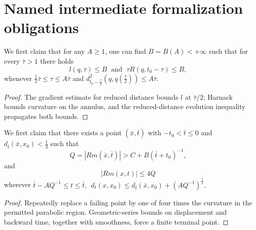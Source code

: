 \section{Named intermediate formalization obligations}
\begin{lemma}
  \label{lem:cz-reduced-distance-curvature-parabolic-annulus}
We first claim that for any $A \geq 1$, one can find
$B=B(A)<+\infty$ such that for every $\bar{\tau}>1$ there holds
\begin{equation} l(q,\tau)\leq B \; \mbox{ and }\;  \tau R(q,t_0-\tau)\leq B,
\end{equation} whenever $\frac{1}{2}\bar{\tau}\leq \tau \leq A\bar{\tau}$ and
$d_{t_0-\frac{\bar{\tau}}{2}}^2 (q,q(\frac{\bar{\tau}}{2}))\leq
A\bar{\tau}.$

\end{lemma}
\begin{proof}
\sketch The gradient estimate for reduced distance bounds $l$ at
$\bar\tau/2$; Harnack bounds curvature on the annulus, and the
reduced-distance evolution inequality propagates both bounds.
\end{proof}
\begin{lemma}
  \label{lem:cz-finite-parabolic-curvature-point-selection}
We first claim that there exists a point $(\bar{x},\bar{t})$ with
$-t_0<\bar{t}\leq 0$ and $d_{\bar{t}}(\bar{x},x_0)<\frac{1}{3}$
such that
$$
Q=|Rm(\bar{x},\bar{t})|>C+ B(\bar{t}+t_0)^{-1},
$$
and \begin{equation}
|Rm(x,t)|\leq 4Q %
\end{equation} wherever $\bar{t}-AQ^{-1}\leq t\leq \bar{t},\ \ d_t(x,x_0)\leq
d_{\bar{t}}(\bar{x},x_0) +(AQ^{-1})^{\frac{1}{2}}.$
\end{lemma}
\begin{proof}
\sketch Repeatedly replace a failing point by one of four times the
curvature in the permitted parabolic region.  Geometric-series bounds
on displacement and backward time, together with smoothness, force a
finite terminal point.
\end{proof}
